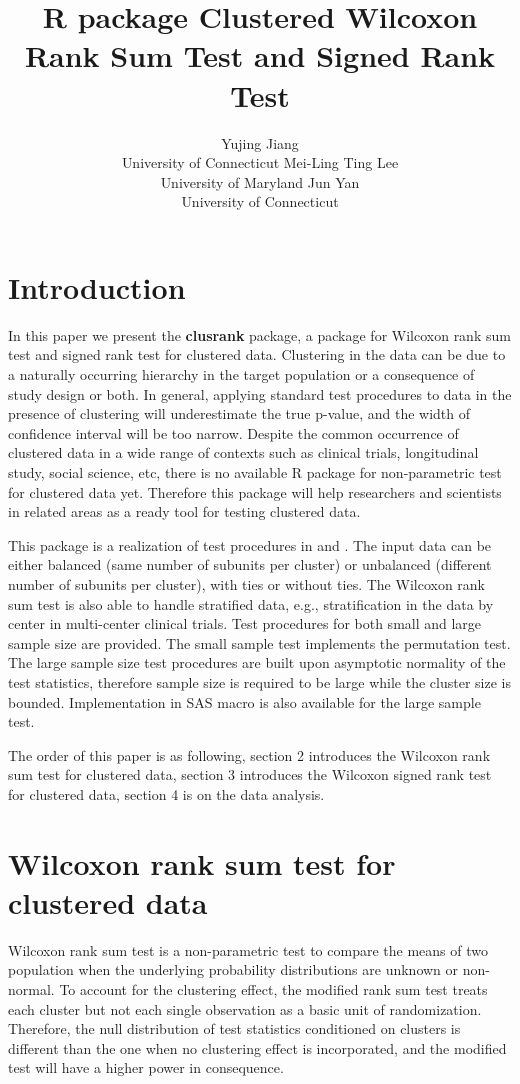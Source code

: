 \documentclass[article]{jss}
\author{Yujing Jiang\\ University of Connecticut \And 
        Mei-Ling Ting Lee\\ University of Maryland
        \And  
        Jun Yan\\ University of Connecticut }
\title{R package Clustered Wilcoxon Rank Sum Test and Signed Rank Test}
\begin{document}

\section{Introduction}
In this paper we present the \textbf{clusrank} package, a package 
for Wilcoxon rank sum test  
and signed rank test 
for clustered data.  
Clustering in the data can be due to 
a naturally occurring hierarchy in the target population
or a consequence of study design or both. 
In general,
applying standard test procedures to data in the presence 
of clustering will underestimate the true p-value, and 
the width of confidence interval will be too narrow.  
Despite the common occurrence of 
clustered data in a wide range of contexts such as 
clinical trials, longitudinal study, social science, etc,
there is no available R package for non-parametric test
for clustered data yet. Therefore this package will help 
researchers and scientists in related areas as a ready tool
for testing clustered data.


This package is a realization of test procedures in 
\citet{Rosn:GLyn:Lee:inco:2003} and \citet{Roxn:Glyn:Lee:wilc:2006}.
The input data can be either balanced (same number of 
subunits per cluster) or unbalanced (different number of subunits 
per cluster), with ties or without ties. The Wilcoxon rank sum
test is also able to handle stratified data, e.g., stratification in the data
by center in multi-center clinical trials. Test procedures for both small and large sample size are provided. The small sample test implements the permutation test. The large sample size test
procedures are built upon asymptotic normality of the test statistics, therefore
sample size is required to be large while the cluster size is bounded. Implementation in
SAS macro is also available for the large sample test.


The order of this paper is as following, 
section 2 introduces the Wilcoxon rank 
sum test for clustered data, section 3 
introduces the Wilcoxon signed rank test 
for clustered data, section 4 is on the 
data analysis.


\section{Wilcoxon rank sum test for clustered data}
Wilcoxon rank sum test is a non-parametric test
to compare the means of two population when the 
underlying probability distributions are unknown 
or non-normal. To account for the clustering effect,
the modified rank sum test treats each cluster but not 
each single observation as a basic unit of randomization. 
Therefore, the null distribution of test statistics
conditioned on clusters is different than the one
when no clustering effect is incorporated,
and the modified test will have a higher power in 
consequence. 
\end{document}
